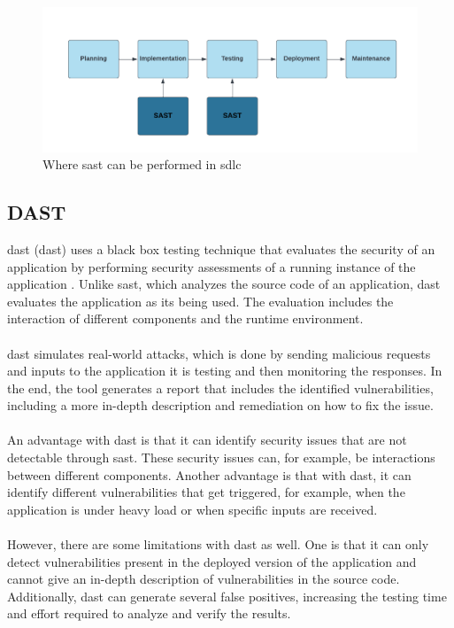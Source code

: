 \vspace{2mm}
\begin{figure}[H]
    \centering
    \includegraphics[width=0.8\columnwidth]{Images/sast.png}
    \caption{Where \acrshort{sast} can be performed in \acrshort{sdlc}}
    \label{fig: Where SAST can be performed in SDLC}
\end{figure}

\subsection{DAST}
\acrlong{dast} (\acrshort{dast}) uses a black box testing technique that evaluates the security of an application by performing security assessments of a running instance of the application \cite{dast}. Unlike \acrshort{sast}, which analyzes the source code of an application, \acrshort{dast} evaluates the application as its being used. The evaluation includes the interaction of different components and the runtime environment. 
\\~\\
\acrshort{dast} simulates real-world attacks, which is done by sending malicious requests and inputs to the application it is testing and then monitoring the responses. In the end, the tool generates a report that includes the identified vulnerabilities, including a more in-depth description and remediation on how to fix the issue. 
\\~\\
An advantage with \acrshort{dast} is that it can identify security issues that are not detectable through \acrshort{sast}. These security issues can, for example, be interactions between different components. Another advantage is that with \acrshort{dast}, it can identify different vulnerabilities that get triggered, for example, when the application is under heavy load or when specific inputs are received.
\\~\\
However, there are some limitations with \acrshort{dast} as well. One is that it can only detect vulnerabilities present in the deployed version of the application and cannot give an in-depth description of vulnerabilities in the source code. Additionally, \acrshort{dast} can generate several false positives, increasing the testing time and effort required to analyze and verify the results. 
